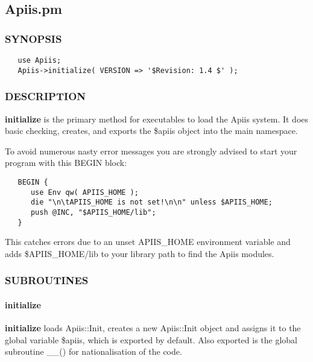 \subsection{Apiis.pm\label{Apiis_pm}}




\subsubsection*{SYNOPSIS\label{Apiis_pm_SYNOPSIS}}
\begin{verbatim}
   use Apiis;
   Apiis->initialize( VERSION => '$Revision: 1.4 $' );
\end{verbatim}
\subsubsection*{DESCRIPTION\label{Apiis_pm_DESCRIPTION}}


\textbf{initialize} is the primary method for executables to load the Apiis
system. It does basic checking, creates, and exports the \$apiis object into
the main namespace.



To avoid numerous nasty error messages you are strongly advised to start
your program with this BEGIN block:

\begin{verbatim}
   BEGIN {
      use Env qw( APIIS_HOME );
      die "\n\tAPIIS_HOME is not set!\n\n" unless $APIIS_HOME;
      push @INC, "$APIIS_HOME/lib";
   }
\end{verbatim}


This catches errors due to an unset APIIS\_HOME environment variable and
adds \$APIIS\_HOME/lib to your library path to find the Apiis modules.

\subsubsection*{SUBROUTINES\label{Apiis_pm_SUBROUTINES}}
\paragraph*{initialize\label{Apiis_pm_initialize}}


\textbf{initialize} loads Apiis::Init, creates a new Apiis::Init object and
assigns it to the global variable \$apiis, which is exported by default.
Also exported is the global subroutine \_\_() for nationalisation of the
code.



